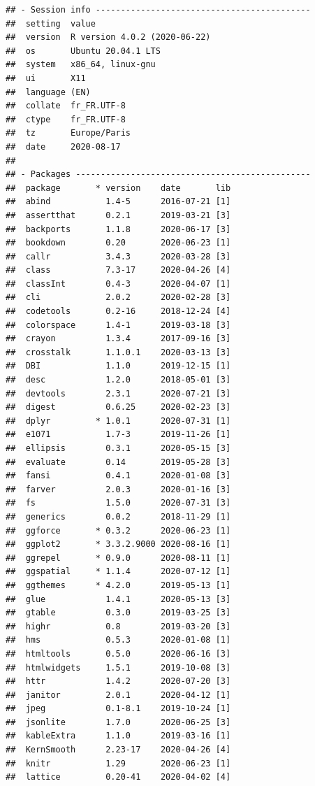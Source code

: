 \documentclass[
  french,
]{book}
\begin{document}
\begin{verbatim}
## - Session info -------------------------------------------
##  setting  value                       
##  version  R version 4.0.2 (2020-06-22)
##  os       Ubuntu 20.04.1 LTS          
##  system   x86_64, linux-gnu           
##  ui       X11                         
##  language (EN)                        
##  collate  fr_FR.UTF-8                 
##  ctype    fr_FR.UTF-8                 
##  tz       Europe/Paris                
##  date     2020-08-17                  
## 
## - Packages -----------------------------------------------
##  package       * version    date       lib
##  abind           1.4-5      2016-07-21 [1]
##  assertthat      0.2.1      2019-03-21 [3]
##  backports       1.1.8      2020-06-17 [3]
##  bookdown        0.20       2020-06-23 [1]
##  callr           3.4.3      2020-03-28 [3]
##  class           7.3-17     2020-04-26 [4]
##  classInt        0.4-3      2020-04-07 [1]
##  cli             2.0.2      2020-02-28 [3]
##  codetools       0.2-16     2018-12-24 [4]
##  colorspace      1.4-1      2019-03-18 [3]
##  crayon          1.3.4      2017-09-16 [3]
##  crosstalk       1.1.0.1    2020-03-13 [3]
##  DBI             1.1.0      2019-12-15 [1]
##  desc            1.2.0      2018-05-01 [3]
##  devtools        2.3.1      2020-07-21 [3]
##  digest          0.6.25     2020-02-23 [3]
##  dplyr         * 1.0.1      2020-07-31 [1]
##  e1071           1.7-3      2019-11-26 [1]
##  ellipsis        0.3.1      2020-05-15 [3]
##  evaluate        0.14       2019-05-28 [3]
##  fansi           0.4.1      2020-01-08 [3]
##  farver          2.0.3      2020-01-16 [3]
##  fs              1.5.0      2020-07-31 [3]
##  generics        0.0.2      2018-11-29 [1]
##  ggforce       * 0.3.2      2020-06-23 [1]
##  ggplot2       * 3.3.2.9000 2020-08-16 [1]
##  ggrepel       * 0.9.0      2020-08-11 [1]
##  ggspatial     * 1.1.4      2020-07-12 [1]
##  ggthemes      * 4.2.0      2019-05-13 [1]
##  glue            1.4.1      2020-05-13 [3]
##  gtable          0.3.0      2019-03-25 [3]
##  highr           0.8        2019-03-20 [3]
##  hms             0.5.3      2020-01-08 [1]
##  htmltools       0.5.0      2020-06-16 [3]
##  htmlwidgets     1.5.1      2019-10-08 [3]
##  httr            1.4.2      2020-07-20 [3]
##  janitor         2.0.1      2020-04-12 [1]
##  jpeg            0.1-8.1    2019-10-24 [1]
##  jsonlite        1.7.0      2020-06-25 [3]
##  kableExtra      1.1.0      2019-03-16 [1]
##  KernSmooth      2.23-17    2020-04-26 [4]
##  knitr           1.29       2020-06-23 [1]
##  lattice         0.20-41    2020-04-02 [4]

\end{verbatim}
\end{document}
